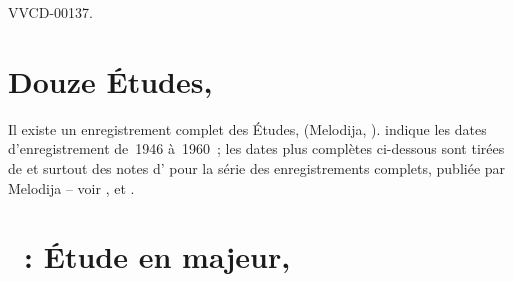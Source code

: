 \begin{workitemize}
{ VVCD-00137.}
 \begin{perfitemize}
  \item{}
 \end{perfitemize}
 \item{}
 \begin{perfitemize}
  \item{}
 \end{perfitemize}
 \item{}
 \begin{perfitemize}
  \item{}
 \end{perfitemize}
\end{workitemize}

\section*{%
Douze Études, }

Il existe un enregistrement complet des Études,  (Melodija,
).
\FMalik{} \citep[voir][p.~72]{Malik} indique les dates d'enregistrement
de~1946 à~1960~; les dates plus complètes ci-dessous sont tirées de
\citet{Masuda} et surtout des notes d'\INikonovich{} pour la série des
enregistrements complets, publiée par Melodija -- voir
\citet[vol.~10]{Nikonovich79}, \citet[p.~8]{Nikonovich11} et
\citet[p.~382]{Scriabine}.

\section{\ifChrono \Scriabine{}~: \fi
Étude en \kC \Sharp majeur,  }
\label{\thesection}

